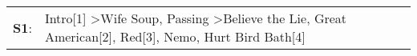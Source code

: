 \begin{supertabular}{p{0.03\textwidth}p{0.92\textwidth}}
 \textbf{S1}:  &  Intro[1]\textsuperscript{} \textgreater \enspace Wife Soup\textsuperscript{}, \enspace Passing\textsuperscript{} \textgreater \enspace Believe the Lie\textsuperscript{}, \enspace Great American[2]\textsuperscript{}, \enspace Red[3]\textsuperscript{}, \enspace Nemo\textsuperscript{}, \enspace Hurt Bird Bath[4]\textsuperscript{}  \enspace  \\
\end{supertabular}
